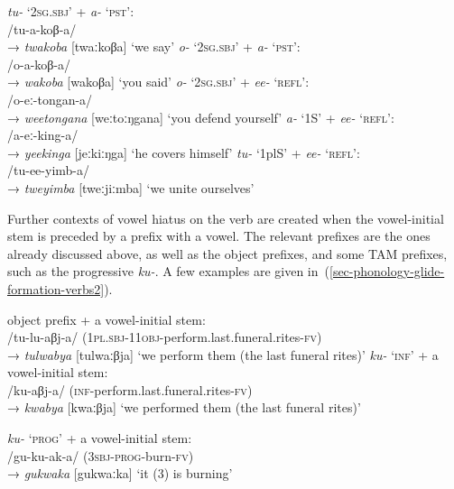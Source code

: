 \ea \label{sec-phonology-glide-formation-verbs}
\begin{xlist}	
	\ex 	 \textit{tu-} `2\textsc{sg.sbj}' +  \textit{a-} `\textsc{pst}':\\
	/tu-a-koβ-a/\\→  \textit{twakoba}  [twaːkoβa] `we say' 
	\label{sec-phonology-glide-formation-verbs-TWA}
	\ex 	 \textit{o-} `2\textsc{sg.sbj}' +  \textit{a-} `\textsc{pst}':\\
	/o-a-koβ-a/\\→  \textit{wakoba}  [wakoβa] `you said' 
	\label{sec-phonology-glide-formation-verbs-OW}
	\ex 	 \textit{o-} `2\textsc{sg.sbj}' +  \textit{ee-} `\textsc{refl}':\\
	/o-eː-tongan-a/\\→  \textit{weetongana}  [weːtoːŋgana] `you defend yourself' 
	\label{sec-phonology-glide-formation-verbs-EE}
	\ex 	 \textit{a-} `1S' +  \textit{ee-} `\textsc{refl}':\\
	/a-eː-king-a/\\→  \textit{yeekinga}  [jeːkiːŋga] `he covers himself' 
	\label{sec-phonology-glide-formation-verbs-AEE}
	\ex 	 \textit{tu-} `1plS' +  \textit{ee-} `\textsc{refl}':\\
	/tu-ee-yimb-a/\\→  \textit{tweyimba}  [tweːjiːmba] `we unite ourselves' 
	\label{sec-phonology-glide-formation-verbs-TUEE}
	\end{xlist}	
\z

Further contexts of vowel hiatus on the verb are created when the vowel-initial stem is preceded by a prefix with a vowel. 
The relevant prefixes are the ones already discussed above, as well as the object prefixes, and some TAM prefixes, such as the progressive  \textit{ku-}. 
A few examples are given in~(\ref{sec-phonology-glide-formation-verbs2}).

\ea \label{sec-phonology-glide-formation-verbs2}
\begin{xlist}
	
	\ex 	object prefix + a vowel-initial stem:\\/tu-lu-aβj-a/ (1\textsc{pl.sbj}-1\textsc{1obj}-perform.last.funeral.rites-\textsc{fv})\\→  \textit{tulwabya}  [tulwaːβja] `we perform them (the last funeral rites)' 	\label{sec-phonology-glide-formation-verbs-OBJA}
	\ex 	 \textit{ku-} `\textsc{inf}' + a vowel-initial stem:\\/ku-aβj-a/ (\textsc{inf}-perform.last.funeral.rites-\textsc{fv})\\→  \textit{kwabya}  [kwaːβja] `we performed them (the last funeral rites)' 	\label{sec-phonology-glide-formation-verbs-OBJB}
	
	\ex 	 \textit{ku-} `\textsc{prog}' + a vowel-initial stem:\\
	/gu-ku-ak-a/ (\textsc{3sbj}-\textsc{prog}-burn-\textsc{fv})\\→  \textit{gukwaka} [gukwaːka] `it (3) is burning' 
	\label{sec-phonology-glide-formation-verbs-KU}
	\end{xlist}	
\z

